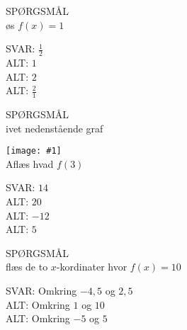 \documentclass[]{article}
\newcounter{spgcounter}
\newenvironment{question}[2]{\addtocounter{spgcounter}{1} SPØRGSMÅL \thespgcounter\\}{\hspace{50px}}
\newcommand{\image}[1]{\texttt{[image: \#1]}\\}
\newcommand{\answer}[1]{{\color{green} SVAR: #1}\\}
\newcommand{\alt}[1]{{\color{red} ALT: #1}\\}
\begin{document}
\begin{question}{multi}
    
Løs $f(x)=1$
        
\answer{$\frac{1}{2}$}
\alt{$1$}
\alt{$2$}
\alt{$\frac{2}{1}$}

\end{question}


\begin{question}{multi}
    
Givet nedenstående graf

\image{andengradsfunktionen1.png}

Aflæs hvad $f(3)$

\answer{$14$}
\alt{$20$}
\alt{$-12$}
\alt{$5$}

\end{question}

\begin{question}{multi}
    
Aflæs de to $x$-kordinater hvor $f(x)=10$
    
\answer{Omkring $-4,5$ og $2,5$}
\alt{Omkring $1$ og $10$}
\alt{Omkring $-5$ og $5$}

\end{question}
\end{document}
